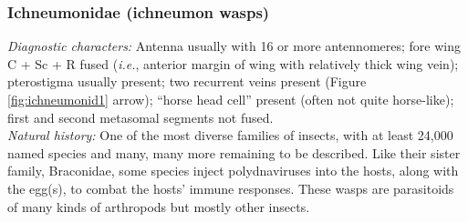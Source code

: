\documentclass[letterpaper, 11pt]{article}
\begin{document}
\subsubsection{Ichneumonidae (ichneumon wasps)}
\noindent{}\textit{Diagnostic characters:} Antenna usually with 16 or more antennomeres; fore wing C + Sc + R fused (\textit{i.e.}, anterior margin of wing with relatively thick wing vein); pterostigma usually present; two recurrent veins present (Figure \ref{fig:ichneumonid1} arrow); ``horse head cell'' present (often not quite horse-like); first and second metasomal segments not fused.\\

\noindent{}\textit{Natural history:} One of the most diverse families of insects, with at least 24,000 named species and many, many more remaining to be described. Like their sister family, Braconidae, some species inject polydnaviruses into the hosts, along with the egg(s), to combat the hosts' immune responses. These wasps are parasitoids of many kinds of arthropods but mostly other insects.\\
\end{document}
